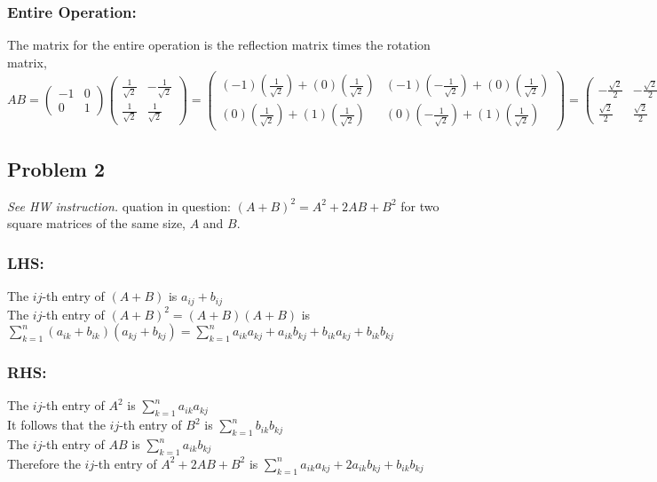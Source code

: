 \documentclass[11pt]{article}
\begin{document}
\subsubsection*{Entire Operation:}
The matrix for the entire operation is the reflection matrix times the rotation matrix,\\
$AB=\begin{pmatrix}-1 & 0\\ 0 & 1\end{pmatrix}\begin{pmatrix}\frac{1}{\sqrt{2}} & -\frac{1}{\sqrt{2}}\\ \frac{1}{\sqrt{2}} & \frac{1}{\sqrt{2}} \end{pmatrix}=\begin{pmatrix}(-1)(\frac{1}{\sqrt{2}}) +(0)(\frac{1}{\sqrt{2}})& (-1)(-\frac{1}{\sqrt{2}})+(0)(\frac{1}{\sqrt{2}})\\ (0)(\frac{1}{\sqrt{2}}) +(1)(\frac{1}{\sqrt{2}})& (0)(-\frac{1}{\sqrt{2}})+(1)(\frac{1}{\sqrt{2}}) \end{pmatrix}=\begin{pmatrix}-\frac{\sqrt{2}}{2} & -\frac{\sqrt{2}}{2}\\ \frac{\sqrt{2}}{2} & \frac{\sqrt{2}}{2} \end{pmatrix}$
\pagebreak

\subsection*{Problem 2}
\textit{See HW instruction.}\newline
quation in question: $(A+B)^2=A^2+2AB+B^2$ for two square matrices of the same size, $A$ and $B$.
\subsubsection*{LHS:}
The $ij$-th entry of $(A+B) $ is $a_{ij}+b_{ij}$\\
The $ij$-th entry of $(A+B)^2 = (A+B)(A+B)$ is $\sum_{k=1}^n (a_{ik}+b_{ik})(a_{kj}+b_{kj})= \sum_{k=1}^n a_{ik}a_{kj}+a_{ik}b_{kj}+b_{ik}a_{kj}+b_{ik}b_{kj}$
\subsubsection*{RHS:}
The $ij$-th entry of $A^2$ is $\sum_{k=1}^n a_{ik}a_{kj}$\\
It follows that the $ij$-th entry of $B^2$ is $\sum_{k=1}^n b_{ik}b_{kj}$\\
The $ij$-th entry of $AB$ is $\sum_{k=1}^n a_{ik}b_{kj}$\\
Therefore the $ij$-th entry of $A^2+2AB+B^2$ is $\sum_{k=1}^n a_{ik}a_{kj} + 2a_{ik}b_{kj}+ b_{ik}b_{kj}$
\end{document}
